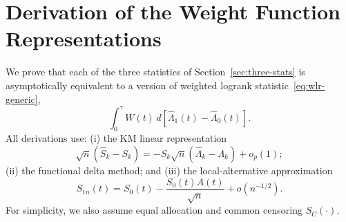 \documentclass[12pt]{article}
\begin{document}
\section{Derivation of the Weight Function Representations}
\label{sec:appendix-weights}

We prove that each of the three statistics of
Section~\ref{sec:three-stats} is asymptotically equivalent to a version of
weighted logrank statistic~\eqref{eq:wlr-generic},
$$\int_0^\tau W(t)\,d[\hat\Lambda_1(t)-\hat\Lambda_0(t)].$$
All derivations use: (i) the KM linear representation
$$\sqrt{n}(\hat S_k-S_k)=-S_k\sqrt{n}(\hat\Lambda_k-\Lambda_k)+o_p(1);$$
(ii)  the functional delta method; and
(iii) the local-alternative approximation
$$S_{1n}(t)=S_0(t)-\frac{S_0(t)A(t)}{\sqrt{n}}+o(n^{-1/2}).$$
For simplicity, we also assume equal allocation and common censoring $S_C(\cdot)$.
\end{document}
